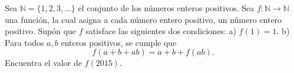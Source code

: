 Sea $\mathbb{N} = \{1, 2, 3, \dots \}$ el conjunto de los números enteros positivos. Sea $f : \mathbb{N} \to \mathbb{N}$ una
función, la cual asigna a cada número entero positivo, un número entero positivo. Supón
que $f$ satisface las siguientes dos condiciones:
a) $f(1) = 1$.  
b) Para todos $a, b$ enteros positivos, se cumple que
\[f (a + b + ab) = a + b + f (ab).\]
Encuentra el valor de $f(2015)$.